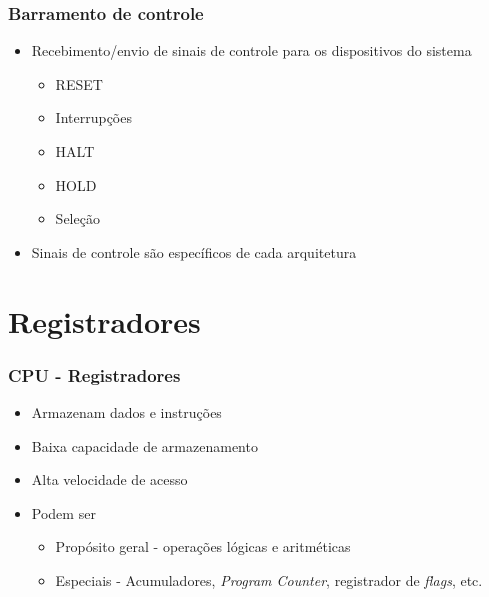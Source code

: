 \documentclass[aspectratio=169,
				xcolor=table]{beamer}
\begin{document}
	\begin{frame}
		\frametitle{Barramento de controle}
		\begin{itemize}
			\item Recebimento/envio de sinais de controle para os dispositivos do sistema
			\begin{itemize}
				\item RESET
				\item Interrupções
				\item HALT
				\item HOLD
				\item Seleção

			\end{itemize}
			\vspace{1em}
			\item Sinais de controle são específicos de cada arquitetura
		\end{itemize}
	\end{frame}
	
	\section{Registradores}
		\begin{frame}
			\frametitle{CPU - Registradores}
			\begin{itemize}
				\item Armazenam dados e instruções
				\vspace{1em}
				\item Baixa capacidade de armazenamento
				\vspace{1em}
				\item Alta velocidade de acesso
				\vspace{1em}
				\item Podem ser
				\begin{itemize}
					\item Propósito geral - operações lógicas e aritméticas
					\item Especiais - Acumuladores, \textit{Program Counter}, registrador de \textit{flags}, etc.
				\end{itemize}
				
			\end{itemize}
		\end{frame}
		
\end{document}
